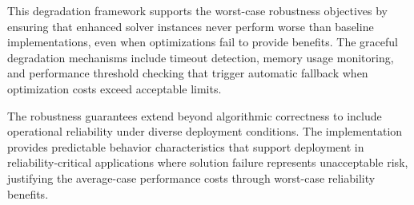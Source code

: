 This degradation framework supports the worst-case robustness objectives by ensuring that enhanced solver instances never perform worse than baseline implementations, even when optimizations fail to provide benefits. The graceful degradation mechanisms include timeout detection, memory usage monitoring, and performance threshold checking that trigger automatic fallback when optimization costs exceed acceptable limits.

The robustness guarantees extend beyond algorithmic correctness to include operational reliability under diverse deployment conditions. The implementation provides predictable behavior characteristics that support deployment in reliability-critical applications where solution failure represents unacceptable risk, justifying the average-case performance costs through worst-case reliability benefits.